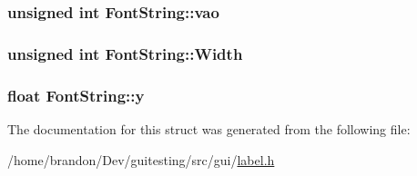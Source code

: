 \hypertarget{struct_font_string_bd3dca7357dc9804574b324119b340ae}{
\subsubsection[{vao}]{\setlength{\rightskip}{0pt plus 5cm}unsigned int {\bf FontString::vao}}}
\label{struct_font_string_bd3dca7357dc9804574b324119b340ae}


\hypertarget{struct_font_string_dc51468d6fa7d9e1c8a588f98527d956}{
\subsubsection[{Width}]{\setlength{\rightskip}{0pt plus 5cm}unsigned int {\bf FontString::Width}}}
\label{struct_font_string_dc51468d6fa7d9e1c8a588f98527d956}


\hypertarget{struct_font_string_5e6d0dff8c6874f046b8c798a22da79b}{
\subsubsection[{y}]{\setlength{\rightskip}{0pt plus 5cm}float {\bf FontString::y}}}
\label{struct_font_string_5e6d0dff8c6874f046b8c798a22da79b}




The documentation for this struct was generated from the following file:\begin{CompactItemize}
\item 
/home/brandon/Dev/guitesting/src/gui/\hyperlink{label_8h}{label.h}\end{CompactItemize}
